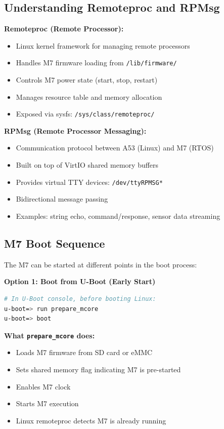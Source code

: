 \documentclass[12pt,a4paper]{report}
\begin{document}
\subsection{Understanding Remoteproc and RPMsg}

\textbf{Remoteproc (Remote Processor):}
\begin{itemize}
    \item Linux kernel framework for managing remote processors
    \item Handles M7 firmware loading from \texttt{/lib/firmware/}
    \item Controls M7 power state (start, stop, restart)
    \item Manages resource table and memory allocation
    \item Exposed via sysfs: \texttt{/sys/class/remoteproc/}
\end{itemize}

\textbf{RPMsg (Remote Processor Messaging):}
\begin{itemize}
    \item Communication protocol between A53 (Linux) and M7 (RTOS)
    \item Built on top of VirtIO shared memory buffers
    \item Provides virtual TTY devices: \texttt{/dev/ttyRPMSG*}
    \item Bidirectional message passing
    \item Examples: string echo, command/response, sensor data streaming
\end{itemize}

\subsection{M7 Boot Sequence}

The M7 can be started at different points in the boot process:

\textbf{Option 1: Boot from U-Boot (Early Start)}

\begin{lstlisting}[language=bash]
# In U-Boot console, before booting Linux:
u-boot=> run prepare_mcore
u-boot=> boot
\end{lstlisting}

\textbf{What \texttt{prepare\_mcore} does:}
\begin{itemize}
    \item Loads M7 firmware from SD card or eMMC
    \item Sets shared memory flag indicating M7 is pre-started
    \item Enables M7 clock
    \item Starts M7 execution
    \item Linux remoteproc detects M7 is already running
\end{itemize}
\end{document}
